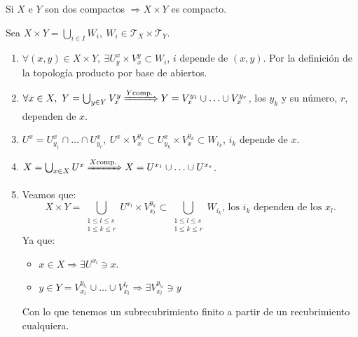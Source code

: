 \begin{theo}[de Tychonoff]
Si $X$ e $Y$ son dos compactos $\Rightarrow X \times Y$ es compacto.
\end{theo}
\begin{demo}
Sea $X \times Y = \bigcup_{i \in  I} W_i,\ W_i \in \mathcal{T}_X \times \mathcal{T}_Y$.
\begin{enumerate}
    \item $\forall \left( x, y \right) \in X \times Y,\ \exists U_y^x \times V_x^y \subset W_i$, $i$ depende de $\left( x, y \right)$. Por la definición de la topología producto por base de abiertos.
    \item $\forall x \in X,\ Y = \bigcup_{y \in Y} V_x^y \xRightarrow{Y \text{comp.}} Y = V_x^{y_1} \cup \ldots \cup V_x^{y_r}$, los $y_k$ y su número, $r$, dependen de $x$.
    \item $U^x = U_{y_1}^x \cap \ldots \cap U_{y_r}^x,\ U^x \times V_x^{y_k} \subset U_{y_k}^x \times V_x^{y_k} \subset W_{i_k}$, $i_k$ depende de $x$.
    \item $X = \bigcup_{x \in X} U^x \xRightarrow{X \text{comp.}} X = U^{x_1} \cup \ldots \cup U^{x_s}$.
    \item Veamos que:
    \[
        X \times Y = \bigcup_{\substack{1 \le l \le s\\ 1 \le k \le r}} U^{x_l} \times V_{x_l}^{y_k} \subset \bigcup_{\substack{1 \le l \le s\\ 1 \le k \le r}} W_{i_k} \text{, los } i_k \text{ dependen de los } x_l. 
    \]
    Ya que:
    \begin{itemize}
        \item $x \in X \Rightarrow \exists U^{x_l} \ni x$.
        \item $y \in Y = V_{x_l}^{y_{l_1}} \cup \ldots \cup V_{x_l}^{l_r} \Rightarrow \exists V_{x_l}^{y_{l_k}} \ni y$
    \end{itemize}
    Con lo que tenemos un subrecubrimiento finito a partir de un recubrimiento cualquiera.
\end{enumerate}
\end{demo}

